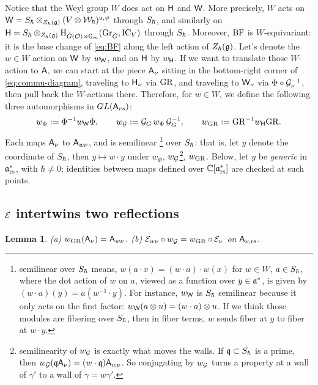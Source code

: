 \documentclass{article}
\theoremstyle{plain}
\newtheorem{lemma}[theorem]{Lemma}
\theoremstyle{definition}
\theoremstyle{remark}
\numberwithin{equation}{section}
\begin{document}
Notice that the Weyl group $W$ does act on $\mathsf H$ and $\mathsf W$. More precisely, $W$ acts on $\mathsf W=S_\hbar\otimes_{Z_\hbar(\mathfrak{g})}(V\otimes\mathcal{W}_\hbar)^{\mathfrak{u},\psi}$ through $S_\hbar$, and similarly on $\mathsf H=S_\hbar\otimes_{Z_\hbar(\mathfrak{g})}\mathrm{H}_{{\check{G}}(\mathcal{O})\rtimes\mathbb{G}_m}(\operatorname{Gr}_{{\check{G}}},\operatorname{IC}_V)$ through $S_\hbar$. Moreover, $\mathrm{BF}$ is $W$-equivariant: it is the base change of \eqref{eq:BF} along the left action of $Z_\hbar(\mathfrak{g})$. Let's denote the $w \in W$ action on $\mathsf W$ by $w_\mathsf W$, and on $\mathsf H$ by $w_\mathsf H$. If we want to translate those $W$-action to $\mathsf A$, we can start at the piece $\mathsf A_\nu$ sitting in the bottom-right corner of \eqref{eq:commu-diagram}, traveling to $\mathsf H_\nu$ via $\mathrm{GR}$, and traveling to $\mathsf W_\nu$ via $\Phi \circ \mathcal G_\nu^{-1}$, then pull back the $W$-actions there. Therefore, for $w\in W$, we define the following three automorphisms in $GL(\mathsf A_{rs})$:
\[
w_\Phi:=\Phi^{-1}w_{\mathsf W}\Phi,\qquad w_{\mathcal G}:=\mathcal G_G\,w_\Phi\,\mathcal G_G^{-1},\qquad w_{\mathrm{GR}}:=\mathrm{GR}^{-1}w_{\mathsf H}\mathrm{GR} .
\]
Each maps $\mathsf A_{\nu}$ to $\mathsf A_{w\nu}$, and is semilinear \footnote{semilinear over $S_\hbar$ means, $w(a\cdot x) = (w\cdot a) \cdot w(x)$ for $w \in W$, $a \in S_\hbar$, where the dot action of $w$ on $a$, viewed as a function over $y\in \mathfrak{a}^*$, is given by $(w\cdot a)(y) = a(w^{-1}\cdot y)$. For instance, $w_\mathsf W$ is $S_\hbar$ semilinear because it only acts on the first factor: $w_\mathsf W (a\otimes u) = (w\cdot a)\otimes u$. If we think those modules are fibering over $S_\hbar$,  then in fiber terms, $w$ sends fiber at $y$ to fiber at $w\cdot y$.} over $S_\hbar$: that is, let $y$ denote the coordinate of $S_\hbar$, then $y\mapsto w\cdot y$ under $w_\Phi$, $w_\mathcal G$\footnote{semilinearity of $w_\mathcal G$ is exactly what moves the walls. If $\mathfrak q \subset S_\hbar$ is a prime, then $w_\mathcal G (\mathfrak q \mathsf A_\nu) = (w\cdot \mathfrak q) \mathsf A_{w\nu}$. So conjugating by $w_\mathcal G$ turns a property at a wall of $\gamma'$ to a wall of $\gamma=w\gamma'$.}, $w_{\mathrm{GR}}$. Below, let $y$ be \emph{generic} in $\mathfrak{a}^*_{\mathrm{rs}}$, with $\hbar\neq0$; identities between maps defined over $\mathbb{C}[\mathfrak{a}^*_{\mathrm{rs}}]$ are checked at such points.

\subsection*{$\mathcal E$ intertwins two reflections}

\begin{lemma}\label{lem:W-basic}
(a) $w_{\mathrm{GR}}(\mathsf A_\nu)=\mathsf A_{w\nu}$. (b) $\mathcal E_{w\nu}\circ w_{\mathcal G}=w_{\mathrm{GR}}\circ\mathcal E_\nu$ on $\mathsf A_{\nu,\mathrm{rs}}$.
\end{lemma}
\end{document}
